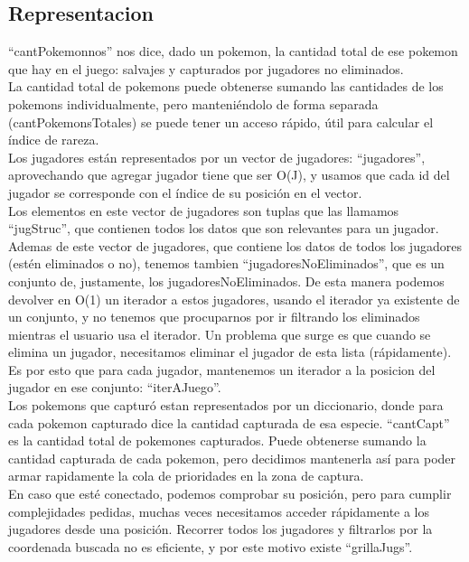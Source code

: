 \begin{Representacion}
\subsection{Representacion}

``cantPokemonnos'' nos dice, dado un pokemon, la cantidad total de ese pokemon que hay en el juego: salvajes y capturados por jugadores no eliminados. \\
La cantidad total de pokemons puede obtenerse sumando las cantidades de los pokemons individualmente, pero manteni\'endolo de forma separada (cantPokemonsTotales) se puede tener un acceso r\'apido, \'util para calcular el \'indice de rareza. \\

Los jugadores est\'an representados por un vector de jugadores: ``jugadores'', aprovechando que agregar jugador tiene que ser O(J), y usamos que cada id del jugador se corresponde con el \'indice de su posici\'on en el vector. \\
Los elementos en este vector de jugadores son tuplas que las llamamos ``jugStruc'', que contienen todos los datos que son relevantes para un jugador. \\
Ademas de este vector de jugadores, que contiene los datos de todos los jugadores (est\'en eliminados o no), tenemos tambien ``jugadoresNoEliminados'', que es un conjunto de, justamente, los jugadoresNoEliminados. De esta manera podemos devolver en O(1) un iterador a estos jugadores, usando el iterador ya existente de un conjunto, y no tenemos que procuparnos por ir filtrando los eliminados mientras el usuario usa el iterador. Un problema que surge es que cuando se elimina un jugador, necesitamos eliminar el jugador de esta lista (r\'apidamente). Es por esto que para cada jugador, mantenemos un iterador a la posicion del jugador en ese conjunto: ``iterAJuego''. \\

Los pokemons que captur\'o estan representados por un diccionario, donde para cada pokemon capturado dice la cantidad capturada de esa especie. ``cantCapt'' es la cantidad total de pokemones capturados. Puede obtenerse sumando la cantidad capturada de cada pokemon, pero decidimos mantenerla as\'i para poder armar rapidamente la cola de prioridades en la zona de captura.\\

En caso que est\'e conectado, podemos comprobar su posici\'on, pero para cumplir complejidades pedidas, muchas veces necesitamos acceder r\'apidamente a los jugadores desde una posici\'on. Recorrer todos los jugadores y filtrarlos por la coordenada buscada no es eficiente, y por este motivo existe ``grillaJugs''.  \\


\end{Representacion}
